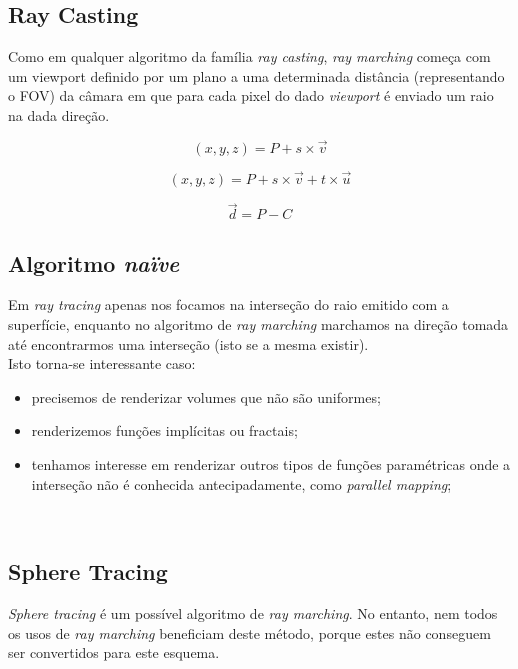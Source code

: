 \subsection{Ray Casting}
Como em qualquer algoritmo da família \textit{ray casting}, \textit{ray marching} começa com um viewport definido por um plano a uma determinada distância (representando o \ac{FOV}) da câmara em que para cada pixel do dado \textit{viewport} é enviado um raio na dada direção.

\begin{equation}
    (x, y, z) = P + s \times \overrightarrow{v}
\end{equation}

\begin{equation}
    (x, y, z) = P + s \times \overrightarrow{v} + t \times \overrightarrow{u}
\end{equation}

\begin{equation}
    \overrightarrow{d} = P - C
\end{equation}




\subsection{Algoritmo \textit{naïve}}
Em \textit{ray tracing} apenas nos focamos na interseção do raio emitido com a superfície, enquanto no algoritmo de \textit{ray marching} marchamos na direção tomada até encontrarmos uma interseção (isto se a mesma existir).\\

Isto torna-se interessante caso:
\begin{itemize}
    \item precisemos de renderizar volumes que não são uniformes;
    \item renderizemos funções implícitas ou fractais;
    \item tenhamos interesse em renderizar outros tipos de funções paramétricas onde a interseção não é conhecida antecipadamente, como \textit{parallel mapping};
\end{itemize}

\\

\subsection{Sphere Tracing}
\textit{Sphere tracing} é um possível algoritmo de \textit{ray marching}. No entanto, nem todos os usos de \textit{ray marching} beneficiam deste método, porque estes não conseguem ser convertidos para este esquema.

